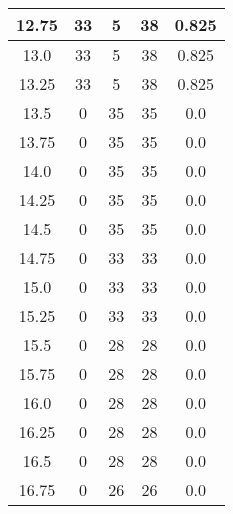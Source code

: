 \documentclass[letterpaper, 12pt]{article}
\begin{document}
\begin{longtable}{|c|c|c|c|c|}
\hline
12.75 & 33 & 5 & 38 & 0.825 \\
\hline
13.0 & 33 & 5 & 38 & 0.825 \\
\hline
13.25 & 33 & 5 & 38 & 0.825 \\
\hline
13.5 & 0 & 35 & 35 & 0.0 \\
\hline
13.75 & 0 & 35 & 35 & 0.0 \\
\hline
14.0 & 0 & 35 & 35 & 0.0 \\
\hline
14.25 & 0 & 35 & 35 & 0.0 \\
\hline
14.5 & 0 & 35 & 35 & 0.0 \\
\hline
14.75 & 0 & 33 & 33 & 0.0 \\
\hline
15.0 & 0 & 33 & 33 & 0.0 \\
\hline
15.25 & 0 & 33 & 33 & 0.0 \\
\hline
15.5 & 0 & 28 & 28 & 0.0 \\
\hline
15.75 & 0 & 28 & 28 & 0.0 \\
\hline
16.0 & 0 & 28 & 28 & 0.0 \\
\hline
16.25 & 0 & 28 & 28 & 0.0 \\
\hline
16.5 & 0 & 28 & 28 & 0.0 \\
\hline
16.75 & 0 & 26 & 26 & 0.0 \\
\hline
\end{longtable}
\end{document}
